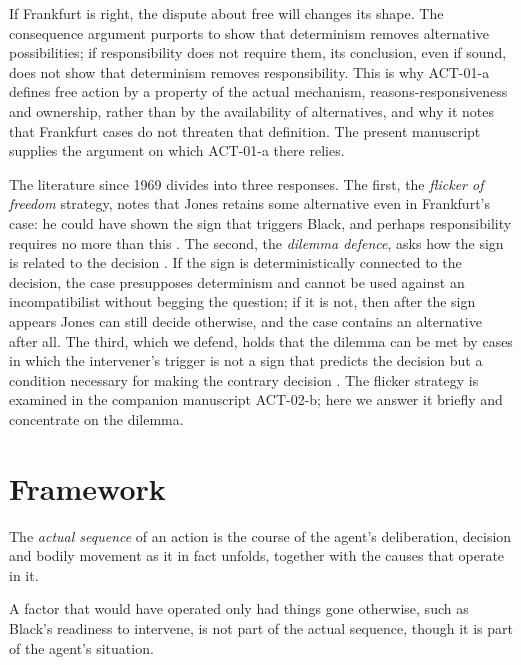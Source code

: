 \documentclass{situationist-preprint}
\begin{document}
If Frankfurt is right, the dispute about free will changes its shape. The consequence argument purports to show that determinism removes alternative possibilities; if responsibility does not require them, its conclusion, even if sound, does not show that determinism removes responsibility. This is why ACT-01-a defines free action by a property of the actual mechanism, reasons-responsiveness and ownership, rather than by the availability of alternatives, and why it notes that Frankfurt cases do not threaten that definition. The present manuscript supplies the argument on which ACT-01-a there relies.

The literature since 1969 divides into three responses. The first, the \emph{flicker of freedom} strategy, notes that Jones retains some alternative even in Frankfurt's case: he could have shown the sign that triggers Black, and perhaps responsibility requires no more than this \citep{Fischer1994}. The second, the \emph{dilemma defence}, asks how the sign is related to the decision \citep{Widerker1995,Ginet1996,Kane1996}. If the sign is deterministically connected to the decision, the case presupposes determinism and cannot be used against an incompatibilist without begging the question; if it is not, then after the sign appears Jones can still decide otherwise, and the case contains an alternative after all. The third, which we defend, holds that the dilemma can be met by cases in which the intervener's trigger is not a sign that predicts the decision but a condition necessary for making the contrary decision \citep{MeleRobb1998,Hunt2000,Pereboom2001}. The flicker strategy is examined in the companion manuscript ACT-02-b; here we answer it briefly and concentrate on the dilemma.

\section{Framework}

\begin{definition}\label{d:seq}
The \emph{actual sequence} of an action is the course of the agent's deliberation, decision and bodily movement as it in fact unfolds, together with the causes that operate in it.
\end{definition}

A factor that would have operated only had things gone otherwise, such as Black's readiness to intervene, is not part of the actual sequence, though it is part of the agent's situation.
\end{document}
